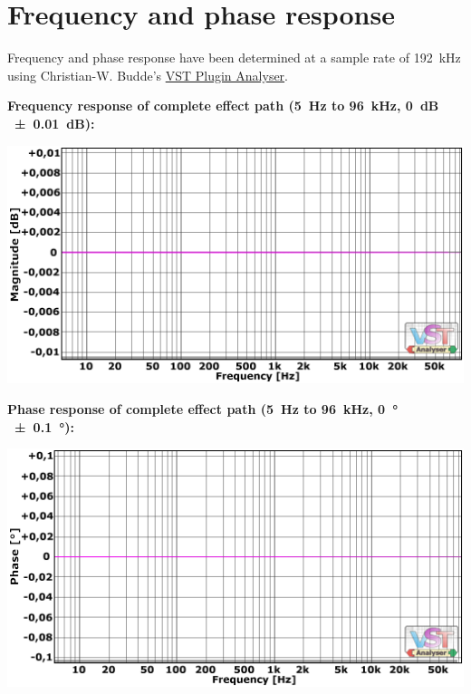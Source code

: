 \newpage %

\section{Frequency and phase response}

Frequency and phase response have been determined at a sample rate of
\SI{192}{\kilo\hertz} using Christian-W. Budde's
\href{http://www.savioursofsoul.de/Christian/programs/measurement-programs/}{VST
  Plugin Analyser}.

\textbf{Frequency response of complete effect path (\SI{5}{\hertz} to
  \SI{96}{\kilo\hertz}, \SI{0}{\dB} \SI{\pm 0.01}{\dB}):}

\begin{center}
  \includegraphics[scale=0.65,clip]{include/images/fft_192khz_freq-fx_path.png}
\end{center}

\textbf{Phase response of complete effect path (\SI{5}{\hertz} to
  \SI{96}{\kilo\hertz}, \SI{0}{\degree}\,\SI{\pm 0.1}{\degree}):}

\begin{center}
  \includegraphics[scale=0.65,clip]{include/images/fft_192khz_phase-fx_path.png}
\end{center}

